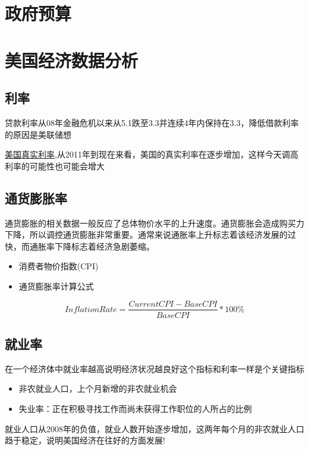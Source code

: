 \section{政府预算}


\section{美国经济数据分析}



\subsection{利率}



贷款利率从08年金融危机以来从5.1跌至3.3并连续4年内保持在3.3，降低借款利率的原因是美联储想

\href{http://data.worldbank.org/indicator/FR.INR.RINR/countries/US?display=graph}{美国真实利率},从2011年到现在来看，美国的真实利率在逐步增加，这样今天调高利率的可能性也可能会增大



\subsection{通货膨胀率}

通货膨胀的相关数据一般反应了总体物价水平的上升速度。通货膨胀会造成购买力下降，所以调控通货膨胀非常重要。通常来说通胀率上升标志着该经济发展的过快，而通胀率下降标志着经济急剧萎缩。

\begin{itemize}
\item 消费者物价指数(CPI)
\item 通货膨胀率计算公式
\end{itemize}
$$Inflation Rate=\frac{Current CPI-Base CPI}{Base CPI}*100\%$$

\subsection{就业率}
在一个经济体中就业率越高说明经济状况越良好这个指标和利率一样是个关键指标
\begin{itemize}
\item 非农就业人口，上个月新增的非农就业机会
\item 失业率：正在积极寻找工作而尚未获得工作职位的人所占的比例
\end{itemize}

就业人口从2008年的负值，就业人数开始逐步增加，这两年每个月的非农就业人口趋于稳定，说明美国经济在往好的方面发展!

